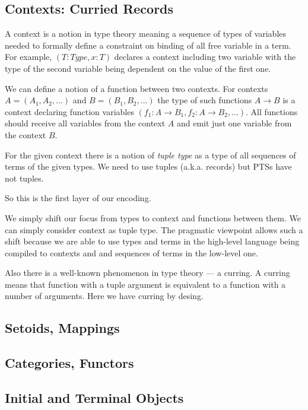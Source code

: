 \documentclass[11pt,oneside]{article}
\begin{document}
\subsection{Contexts: Curried Records}

A context is a notion in type theory meaning a sequence of types of variables
needed to formally define a constraint on binding of all free variable in a term.
For example, $( T : Type, x : T )$ declares a context including two variable with
the type of the second variable being dependent on the value of the first one.

We can define a notion of a function between two contexts.
For contexts $A = (A_1, A_2, ...)$ and $B = (B_1, B_2, ...)$
the type of such functions $A \rightarrow B$ is a context declaring
function variables $(f_1 : A \rightarrow B_1, f_2 : A \rightarrow B_2, ...)$.
All functions should receive all variables from the context $A$ and
emit just one variable from the context $B$.

For the given context there is a notion of {\em tuple type}
as a type of all sequences of terms of the given types.
We need to use tuples (a.k.a. records) but PTSs have not tuples.

So this is the first layer of our encoding.

We simply shift our focus from types to context and functions between them.
We can simply consider context as tuple type.
The pragmatic viewpoint allows such a shift because we are able to use
types and terms in the high-level language being compiled to contexts and and sequences of terms in the low-level one.

Also there is a well-known phenomenon in type theory --- a curring.
A curring means that function with a tuple argument is
equivalent to a function with a number of arguments.
Here we have curring by desing.

\subsection{Setoids, Mappings}

\subsection{Categories, Functors}

\subsection{Initial and Terminal Objects}
\end{document}
